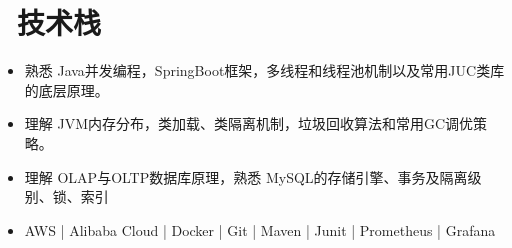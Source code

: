 \documentclass{resume}
\begin{document}


\section{\faCogs\ 技术栈}
\begin{itemize}[parsep=0.5ex]
  \item 熟悉 Java并发编程，SpringBoot框架，多线程和线程池机制以及常用JUC类库的底层原理。
  \item 理解 JVM内存分布，类加载、类隔离机制，垃圾回收算法和常用GC调优策略。
  \item 理解 OLAP与OLTP数据库原理，熟悉 MySQL的存储引擎、事务及隔离级别、锁、索引
  \item AWS | Alibaba Cloud | Docker | Git | Maven | Junit | Prometheus | Grafana
\end{itemize}

%
%
\end{document}

